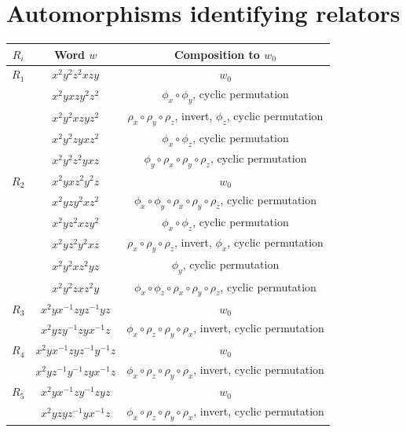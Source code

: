 \documentclass[a4paper,12pt,oneside]{article}
\begin{document}



\newpage
\appendix
\section{Automorphisms identifying relators}\label{app:automorphisms}
\begin{table}[h!]
\centering
\begin{tabular}{|c|c|c|}
\hline
$R_i$ & Word $w$ & Composition to $w_0$ \\
\hline
$R_1$ & $x^2 y^2 z^2 x z y$ & $w_0$  \\
      & $x^2 y x z y^2 z^2$ & $\phi_x \circ \phi_y$, cyclic permutation \\
      & $x^2 y^2 x z y z^2$ & $\rho_x \circ \rho_y \circ \rho_z$, invert, $\phi_z$, cyclic permutation \\
      & $x^2 y^2 z y x z^2$ & $\phi_x \circ \phi_z$, cyclic permutation \\
      & $x^2 y^2 z^2 y x z$ & $\phi_y \circ \rho_x \circ \rho_y \circ \rho_z$, cyclic permutation \\
\hline
$R_2$ & $x^2 y x z^2 y^2 z$ & $w_0$  \\
      & $x^2 y z y^2 x z^2$ & $\phi_x \circ \phi_y \circ \rho_x \circ \rho_y \circ \rho_z$, cyclic permutation \\
      & $x^2 y z^2 x z y^2$ & $\phi_x \circ \phi_z$, cyclic permutation \\
      & $x^2 y z^2 y^2 x z$ & $\rho_x \circ \rho_y \circ \rho_z$, invert, $\phi_x$, cyclic permutation \\
      & $x^2 y^2 x z^2 y z$ & $\phi_y$, cyclic permutation \\
      & $x^2 y^2 z x z^2 y$ & $\phi_x \circ \phi_z \circ \rho_x \circ \rho_y \circ \rho_z$, cyclic permutation \\
\hline
$R_3$ & $x^2 y x^{-1} z y z^{-1} y z$ & $w_0$  \\
      & $x^2 y z y^{-1} z y x^{-1} z$ & $\phi_x\circ\rho_z \circ \rho_y \circ \rho_x$, invert, cyclic permutation \\
\hline
$R_4$ & $x^2 y x^{-1} z y z^{-1} y^{-1} z$ & $w_0$  \\
      & $x^2 y z^{-1} y^{-1} z y x^{-1} z$ & $\phi_x\circ\rho_z \circ \rho_y \circ \rho_x$, invert, cyclic permutation \\
\hline
$R_5$ & $x^2 y x^{-1} z y^{-1} z y z$ & $w_0$  \\
      & $x^2 y z y z^{-1} y x^{-1} z$ & $\phi_x\circ\rho_z \circ \rho_y \circ \rho_x$, invert, cyclic permutation \\

\end{tabular}
\end{table}
\end{document}
